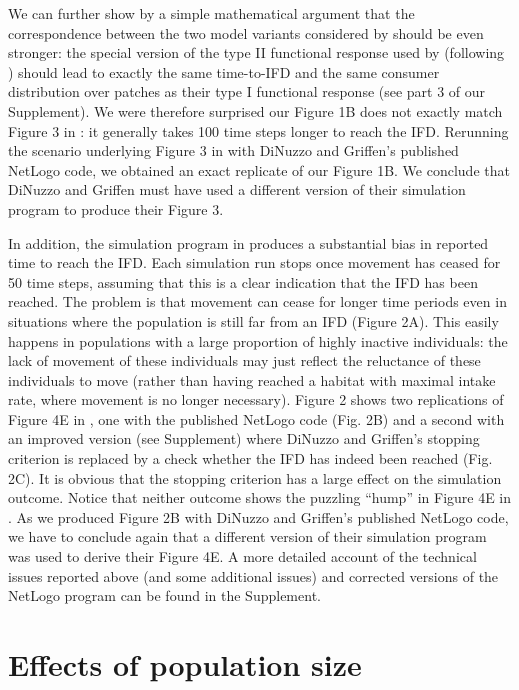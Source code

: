 \begin{refsection}
	We can further show by a simple mathematical argument that the correspondence between the two model variants considered by \citeauthor{dinuzzo2020} should be even stronger: the special version of the type II functional response used by \citeauthor{dinuzzo2020} (following \citeauthor{abrams2000}) should lead to exactly the same time-to-IFD and the same consumer distribution over patches as their type I functional response (see part 3 of our Supplement).
	We were therefore surprised our Figure 1B does not exactly match Figure 3 in \citep{dinuzzo2020}: it generally takes 100 time steps longer to reach the IFD.
	Rerunning the scenario underlying Figure 3 in \citep{dinuzzo2020} with DiNuzzo and Griffen's published NetLogo code, we obtained an exact replicate of our Figure 1B.
	We conclude that DiNuzzo and Griffen must have used a different version of their simulation program to produce their Figure 3.

	In addition, the simulation program in \citep{dinuzzo2020} produces a substantial bias in reported time to reach the IFD.
	Each simulation run stops once movement has ceased for 50 time steps, assuming that this is a clear indication that the IFD has been reached.
	The problem is that movement can cease for longer time periods even in situations where the population is still far from an IFD (Figure 2A).
	This easily happens in populations with a large proportion of highly inactive individuals: the lack of movement of these individuals may just reflect the reluctance of these individuals to move (rather than having reached a habitat with maximal intake rate, where movement is no longer necessary).
	Figure 2 shows two replications of Figure 4E in \citep{dinuzzo2020}, one with the published NetLogo code (Fig. 2B) and a second with an improved version (see Supplement) where DiNuzzo and Griffen's stopping criterion is replaced by a check whether the IFD has indeed been reached (Fig. 2C).
	It is obvious that the stopping criterion has a large effect on the simulation outcome.
	Notice that neither outcome shows the puzzling ``hump'' in Figure 4E in \citep{dinuzzo2020}.
	As we produced Figure 2B with DiNuzzo and Griffen's published NetLogo code, we have to conclude again that a different version of their simulation program was used to derive their Figure 4E.
	A more detailed account of the technical issues reported above (and some additional issues) and corrected versions of the NetLogo program can be found in the Supplement.

	\section*{Effects of population size}
	

\end{refsection}
